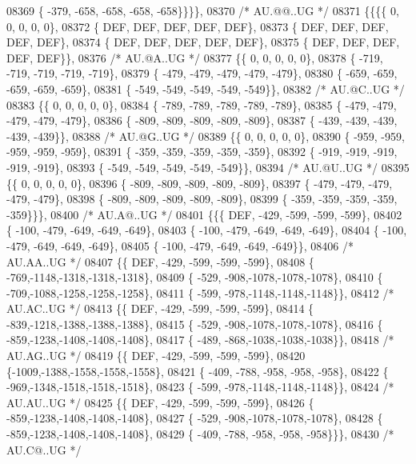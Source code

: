 \begin{DoxyCode}
08369 \{ -379, -658, -658, -658, -658\}\}\}\},
08370 \textcolor{comment}{/* AU.@@..UG */}
08371 \{\{\{\{    0,    0,    0,    0,    0\},
08372 \{  DEF,  DEF,  DEF,  DEF,  DEF\},
08373 \{  DEF,  DEF,  DEF,  DEF,  DEF\},
08374 \{  DEF,  DEF,  DEF,  DEF,  DEF\},
08375 \{  DEF,  DEF,  DEF,  DEF,  DEF\}\},
08376 \textcolor{comment}{/* AU.@A..UG */}
08377 \{\{    0,    0,    0,    0,    0\},
08378 \{ -719, -719, -719, -719, -719\},
08379 \{ -479, -479, -479, -479, -479\},
08380 \{ -659, -659, -659, -659, -659\},
08381 \{ -549, -549, -549, -549, -549\}\},
08382 \textcolor{comment}{/* AU.@C..UG */}
08383 \{\{    0,    0,    0,    0,    0\},
08384 \{ -789, -789, -789, -789, -789\},
08385 \{ -479, -479, -479, -479, -479\},
08386 \{ -809, -809, -809, -809, -809\},
08387 \{ -439, -439, -439, -439, -439\}\},
08388 \textcolor{comment}{/* AU.@G..UG */}
08389 \{\{    0,    0,    0,    0,    0\},
08390 \{ -959, -959, -959, -959, -959\},
08391 \{ -359, -359, -359, -359, -359\},
08392 \{ -919, -919, -919, -919, -919\},
08393 \{ -549, -549, -549, -549, -549\}\},
08394 \textcolor{comment}{/* AU.@U..UG */}
08395 \{\{    0,    0,    0,    0,    0\},
08396 \{ -809, -809, -809, -809, -809\},
08397 \{ -479, -479, -479, -479, -479\},
08398 \{ -809, -809, -809, -809, -809\},
08399 \{ -359, -359, -359, -359, -359\}\}\},
08400 \textcolor{comment}{/* AU.A@..UG */}
08401 \{\{\{  DEF, -429, -599, -599, -599\},
08402 \{ -100, -479, -649, -649, -649\},
08403 \{ -100, -479, -649, -649, -649\},
08404 \{ -100, -479, -649, -649, -649\},
08405 \{ -100, -479, -649, -649, -649\}\},
08406 \textcolor{comment}{/* AU.AA..UG */}
08407 \{\{  DEF, -429, -599, -599, -599\},
08408 \{ -769,-1148,-1318,-1318,-1318\},
08409 \{ -529, -908,-1078,-1078,-1078\},
08410 \{ -709,-1088,-1258,-1258,-1258\},
08411 \{ -599, -978,-1148,-1148,-1148\}\},
08412 \textcolor{comment}{/* AU.AC..UG */}
08413 \{\{  DEF, -429, -599, -599, -599\},
08414 \{ -839,-1218,-1388,-1388,-1388\},
08415 \{ -529, -908,-1078,-1078,-1078\},
08416 \{ -859,-1238,-1408,-1408,-1408\},
08417 \{ -489, -868,-1038,-1038,-1038\}\},
08418 \textcolor{comment}{/* AU.AG..UG */}
08419 \{\{  DEF, -429, -599, -599, -599\},
08420 \{-1009,-1388,-1558,-1558,-1558\},
08421 \{ -409, -788, -958, -958, -958\},
08422 \{ -969,-1348,-1518,-1518,-1518\},
08423 \{ -599, -978,-1148,-1148,-1148\}\},
08424 \textcolor{comment}{/* AU.AU..UG */}
08425 \{\{  DEF, -429, -599, -599, -599\},
08426 \{ -859,-1238,-1408,-1408,-1408\},
08427 \{ -529, -908,-1078,-1078,-1078\},
08428 \{ -859,-1238,-1408,-1408,-1408\},
08429 \{ -409, -788, -958, -958, -958\}\}\},
08430 \textcolor{comment}{/* AU.C@..UG */}

\end{DoxyCode}
